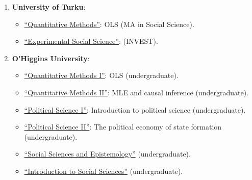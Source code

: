 \begin{enumerate}

  \item {\bf University of Turku}:

      \begin{itemize}
      \item[\textcolor{gray}{\textbullet}] \href{https://github.com/hbahamonde/OLS/raw/master/Bahamonde_OLS.pdf}{``Quantitative Methods''}: {\color{gray}OLS (MA in Social Science)}.
      \item[\textcolor{gray}{\textbullet}] \href{https://github.com/hbahamonde/OLS/raw/master/Bahamonde_OLS.pdf}{``Experimental Social Science''}: {\color{gray}(INVEST)}.
    \end{itemize}


\item {\bf O\'\unskip Higgins University}:
  
    \begin{itemize}
      \item[\textcolor{gray}{\textbullet}] \href{https://github.com/hbahamonde/OLS/raw/master/Lectures/Spanish/Bahamonde_OLS_Spanish.pdf}{``Quantitative Methods I''}: {\color{gray}OLS (undergraduate)}.
      \item[\textcolor{gray}{\textbullet}] \href{https://github.com/hbahamonde/MLE/raw/master/Lectures/Spanish/Bahamonde_MLE_Spanish.pdf}{``Quantitative Methods II''}: {\color{gray}MLE and causal inference (undergraduate)}.
      \item[\textcolor{gray}{\textbullet}] \href{https://github.com/hbahamonde/Ciencia_Politica_I/raw/master/Bahamonde_Ciencia_Politica_I.pdf}{``Political Science I''}: {\color{gray} Introduction to political science (undergraduate)}.
      \item[\textcolor{gray}{\textbullet}] \href{https://github.com/hbahamonde/Ciencia_Politica_II/raw/master/Bahamonde_Ciencia_Politica_II.pdf}{``Political Science II''}: {\color{gray} The political economy of state formation (undergraduate)}.
      \item[\textcolor{gray}{\textbullet}] \href{https://github.com/hbahamonde/Social_Sciences_Epistemology_UGRAD/raw/master/Bahamonde_Social_Sciences_Epistemology_UGRAD_Syllabus.pdf}{``Social Sciences and Epistemology''} {\color{gray} (undergraduate)}.
      \item[\textcolor{gray}{\textbullet}] \href{https://github.com/hbahamonde/Intro_Ciencias_Sociales/raw/master/Bahamonde_Intro_Ciencias_Sociales.pdf}{``Introduction to Social Sciences''} {\color{gray} (undergraduate)}.
    \end{itemize}


\end{enumerate}
